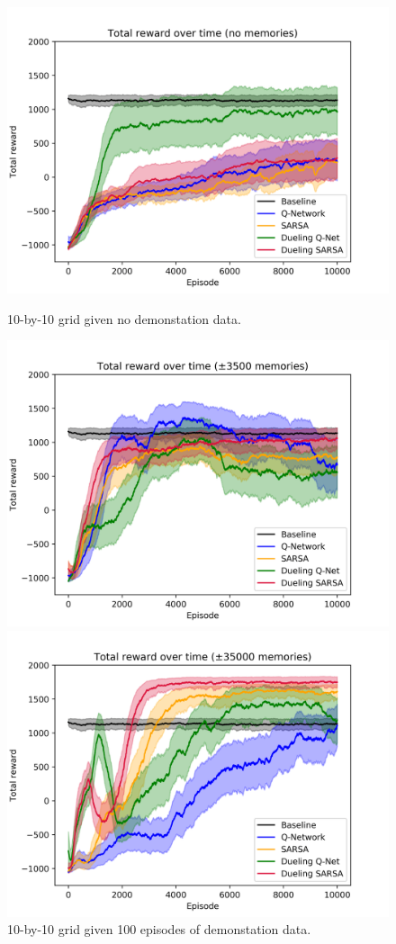 \begin{figure}[h]
    \centering
    \includegraphics[width=\linewidth]{img/results/10-sized/total_rewards_0m-min.png}
    \caption{10-by-10 grid given no demonstation data.}
    \label{fig:10sized-nomem}
    \includegraphics[width=\linewidth]{img/results/10-sized/total_rewards_100m-min.png}
    \caption{10-by-10 grid given 100 episodes of demonstation data.}
    \label{fig:10sized-100mem}
    \includegraphics[width=\linewidth]{img/results/10-sized/total_rewards_1000m-min.png}

\end{figure}
